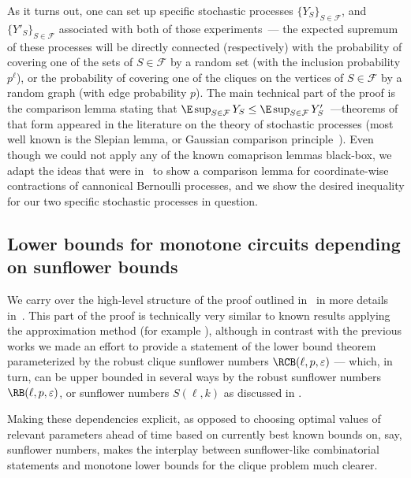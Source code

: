 As it turns out, one can set up specific stochastic processes $\{Y_S\}_{S \in \mathcal{F}}$, and $\{Y'_S\}_{S \in \mathcal{F}}$ associated with both of those experiments~--- the expected supremum of these processes will be directly connected (respectively) with the probability of covering one of the sets of $S \in \mathcal{F}$ by a random set (with the inclusion probability $p^\ell$), or the probability of covering one of the cliques on the vertices of $S \in \mathcal{F}$ by a random graph (with edge probability $p$). The main technical part of the proof is the comparison lemma stating that $\E \sup_{S \in \mathcal{F}} Y_S \leq \E \sup_{S \in \mathcal{F}} Y'_S$~---theorems of that form appeared in the literature on the theory of stochastic processes (most well known is the Slepian lemma, or Gaussian comparison principle~\cite[Corollary 2.10.12]{talagrand2014upper}). Even though we could not apply any of the known comaprison lemmas black-box, we adapt the ideas that were in~\cite{talagrand93} to show a comparison lemma for coordinate-wise contractions of cannonical Bernoulli processes, and we show the desired inequality for our two specific stochastic processes in question.
\subsection{Lower bounds for monotone circuits depending on sunflower bounds \label{sec:intro-clique-sunflower-bounds}}
We carry over the high-level structure of the proof outlined in~ in more details in~. This part of the proof is technically very similar to known results applying the approximation method (for example \cite{razborov1985lower,alon87,cavalar2022}), although in contrast with the previous works we made an effort to provide a statement of the lower bound theorem parameterized by the robust clique sunflower numbers $\RCB(\ell, p, \varepsilon)$ --- which, in turn, can be upper bounded in several ways by the robust sunflower numbers $\RB(\ell, p, \varepsilon)$, or sunflower numbers $S(\ell ,k)$ as discussed in .

Making these dependencies explicit, as opposed to choosing optimal values of relevant parameters ahead of time based on currently best known bounds on, say, sunflower numbers, makes the interplay between sunflower-like combinatorial statements and monotone lower bounds for the clique problem much clearer.


